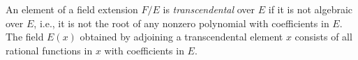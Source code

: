 An element of a field extension $F/E$ is \emph{transcendental} over $E$ if it is not algebraic over $E$, i.e., it is not the root of any nonzero polynomial with coefficients in $E$. The field $E(x)$ obtained by adjoining a transcendental element $x$ consists of all rational functions in $x$ with coefficients in $E$.